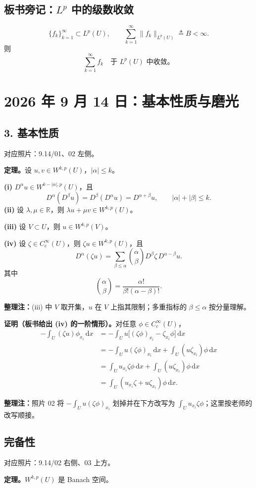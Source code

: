 \documentclass[UTF8,a4paper,11pt,fontset=fandol]{ctexart}
\newcommand{\R}{\mathbb R}
\newcommand{\dd}{\,\mathrm d}
\newcommand{\ednote}[1]{\par{\small\color{notegray}\textbf{整理注：}#1}\par}
\newcommand{\source}[1]{{\small\color{notegray}对应照片：#1。}\par}
\begin{document}
\subsection*{板书旁记：$L^p$ 中的级数收敛}
\[
\{f_k\}_{k=1}^{\infty}\subset L^p(U),\qquad
\sum_{k=1}^{\infty}\|f_k\|_{L^p(U)}\triangleq B<\infty.
\]
则
\[
\sum_{k=1}^{\infty}f_k\quad\text{于 }L^p(U)\text{ 中收敛。}
\]

\clearpage
{}
\section*{2026 年 9 月 14 日：基本性质与磨光}
\subsection*{3. 基本性质}
\source{9.14/01、02 左侧}
\textbf{定理。}设 $u,v\in W^{k,p}(U)$，$|\alpha|\leq k$。

\textbf{(i)} $D^\alpha u\in W^{k-|\alpha|,p}(U)$，且
\[
D^\alpha(D^\beta u)=D^\beta(D^\alpha u)=D^{\alpha+\beta}u,
\qquad |\alpha|+|\beta|\leq k.
\]
\textbf{(ii)} 设 $\lambda,\mu\in\R$，则 $\lambda u+\mu v\in W^{k,p}(U)$。

\textbf{(iii)} 设 $V\subset U$，则 $u\in W^{k,p}(V)$。

\textbf{(iv)} 设 $\zeta\in C_c^\infty(U)$，则 $\zeta u\in W^{k,p}(U)$，且
\[
\boxed{D^\alpha(\zeta u)=\sum_{\beta\leq\alpha}
\binom\alpha\beta D^\beta\zeta\,D^{\alpha-\beta}u.}
\]
其中
\[
\binom\alpha\beta=\frac{\alpha!}{\beta!(\alpha-\beta)!}.
\]
\ednote{(iii) 中 $V$ 取开集，$u$ 在 $V$ 上指其限制；多重指标的 $\beta\leq\alpha$ 按分量理解。}

\textbf{证明（板书给出 (iv) 的一阶情形）。}对任意 $\phi\in C_c^\infty(U)$，
\[
\begin{aligned}
-\int_U(\zeta u)\phi_{x_i}\dd x
&=-\int_Uu\bigl[(\zeta\phi)_{x_i}-\zeta_{x_i}\phi\bigr]\dd x\\
&=-\int_Uu(\zeta\phi)_{x_i}\dd x+\int_U(u\zeta_{x_i})\phi\dd x\\
&=\int_Uu_{x_i}\zeta\phi\dd x+\int_U(u\zeta_{x_i})\phi\dd x\\
&=\int_U(u_{x_i}\zeta+u\zeta_{x_i})\phi\dd x.
\end{aligned}
\]
\ednote{照片 02 将 $-\int_Uu(\zeta\phi)_{x_i}$ 划掉并在下方改写为 $\int_Uu_{x_i}\zeta\phi$；这里按老师的改写顺接。}

\newpage
\subsection*{完备性}
\source{9.14/02 右侧、03 上方}
\textbf{定理。}$W^{k,p}(U)$ 是 Banach 空间。
\end{document}

